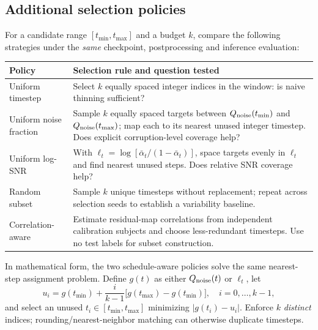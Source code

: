 \documentclass[10pt,a4paper]{article}
\begin{document}
\subsection{Additional selection policies}
For a candidate range $[t_{\min},t_{\max}]$ and a budget $k$, compare the following strategies under the \emph{same} checkpoint, postprocessing and inference evaluation:
\par\medskip\noindent\begin{tabularx}{\linewidth}{@{}p{34mm}X@{}}
\toprule Policy & Selection rule and question tested\\\midrule
Uniform timestep & Select $k$ equally spaced integer indices in the window: is naive thinning sufficient?\\
Uniform noise fraction & Sample $k$ equally spaced targets between $Q_{\rm noise}(t_{\min})$ and $Q_{\rm noise}(t_{\max})$; map each to its nearest unused integer timestep. Does explicit corruption-level coverage help?\\
Uniform log-SNR & With $\ell_t=\log[\bar\alpha_t/(1-\bar\alpha_t)]$, space targets evenly in $\ell_t$ and find nearest unused steps. Does relative SNR coverage help?\\
Random subset & Sample $k$ unique timesteps without replacement; repeat across selection seeds to establish a variability baseline.\\
Correlation-aware & Estimate residual-map correlations from independent calibration subjects and choose less-redundant timesteps. Use no test labels for subset construction.\\\bottomrule
\end{tabularx}\par\medskip
In mathematical form, the two schedule-aware policies solve the same nearest-step assignment problem. Define $g(t)$ as either $Q_{\rm noise}(t)$ or $\ell_t$, let
\begin{equation}
 u_i=g(t_{\min})+\frac{i}{k-1}\big[g(t_{\max})-g(t_{\min})\big],\quad i=0,\ldots,k-1,
\end{equation}
and select an unused $t_i\in[t_{\min},t_{\max}]$ minimizing $|g(t_i)-u_i|$. Enforce $k$ \emph{distinct} indices; rounding/nearest-neighbor matching can otherwise duplicate timesteps.
\end{document}
